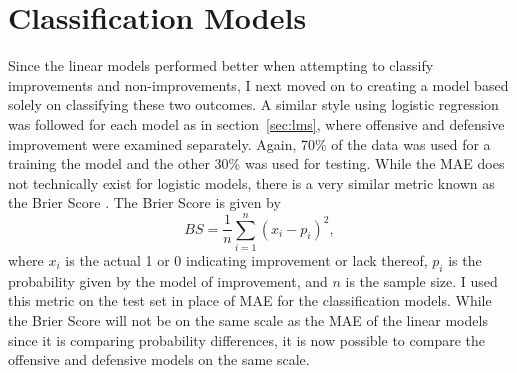 \documentclass[12pt]{article}
\begin{document}
\begin{table}[tbp]
\caption{Defensive Linear Model Evaluators}
\centering
{}
\label{tab:dlm-results}
\end{table}


\section{Classification Models}
\label{sec:cms}
Since the linear models performed better when attempting to classify improvements and non-improvements, I next moved on to creating a model based solely on classifying these two outcomes. A similar style using logistic regression was followed for each model as in section~\ref{sec:lms}, where offensive and defensive improvement were examined separately. Again, 70\% of the data was used for a training the model and the other 30\% was used for testing. While the MAE does not technically exist for logistic models, there is a very similar metric known as the Brier Score \citep[][]{rufibach2010use}. The Brier Score is given by 
\begin{equation}
  BS=\frac{1}{n}\sum_{i=1}^{n}(x_{i}-p_{i})^{2},
\end{equation}
where \(x_{i}\) is the actual 1 or 0 indicating improvement or lack thereof, \(p_{i}\) is the probability given by the model of improvement, and \(n\) is the sample size. I used this metric on the test set in place of MAE for the classification models. While the Brier Score will not be on the same scale as the MAE of the linear models since it is comparing probability differences, it is now possible to compare the offensive and defensive models on the same scale.
\end{document}
